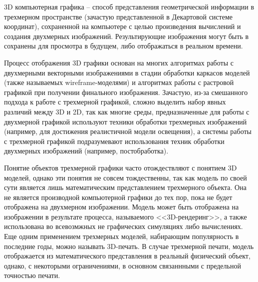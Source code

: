 3D компьютерная графика -- способ представления геометрической информации в трехмерном пространстве (зачастую представленной
в Декартовой системе координат), сохраненной на компьютере с целью произведения вычислений и создания двухмерных изображений.
Результирующие изображения могут быть в сохранены для просмотра в будущем, либо отображаться в реальном времени. 

Процесс отображения 3D графики основан на многих алгоритмах работы с двухмерными векторными изображениями в стадии обработки
каркасов моделей (также называемых wireframe-моделями) и алгоритмах работы с растровой графикой при получении финального изображения.
Зачастую, из-за смешанного подхода к работе с трехмерной графикой, сложно выделить набор явных различий между 3D и 2D, так как многие
среды, предназначенные для работы с двухмерной графикой используют техники обработки трехмерных изображений (например, для достижения
реалистичной модели освещения), а системы работы с трехмерной графикой подразумевают использования техник обработки двухмерных изображений
(например, постобработка).

Понятие объектов трехмерной графики часто отождествляют с понятием 3D моделей, однако эти понятия не совсем тождественны,
так как модель по своей сути является лишь математическим представлением трехмерного объекта. Она не является производной
компьютерной графики до тех пор, пока не будет отображена на двухмерном изображении. Модель может быть отображена на изображении
в результате процесса, называемого <<3D-рендеринг>>, а также использована во всевозмжных не графических симуляциях либо вычислениях.
Еще одним применением трехмерных моделей, набирающим популярность в последние годы, можно называть 3D-печать. В случае трехмерной
печати, модель отображается из математического представления в реальный физический объект, однако, с некоторыми ограничениями, в
основном связаннными с предельной точностью печати.
